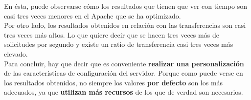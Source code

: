 En ésta, puede observarse cómo los resultados que tienen que ver con tiempo son casi tres veces menores en el Apache que se ha optimizado. 
\\

Por otro lado, los resultados obtenidos en relación con las transferencias son casi tres veces más altos. Lo que quiere decir que se hacen tres veces más de solicitudes por segundo y existe un ratio de transferencia casi tres veces más elevado.
\\

Para concluir, hay que decir que es conveniente \textbf{realizar una personalización} de las características de configuración del servidor. Porque como puede verse en los resultados obtenidos, no siempre los valores \textbf{por defecto} son los más adecuados, ya que \textbf{utilizan más recursos} de los que de verdad son necesarios.

\newpage




